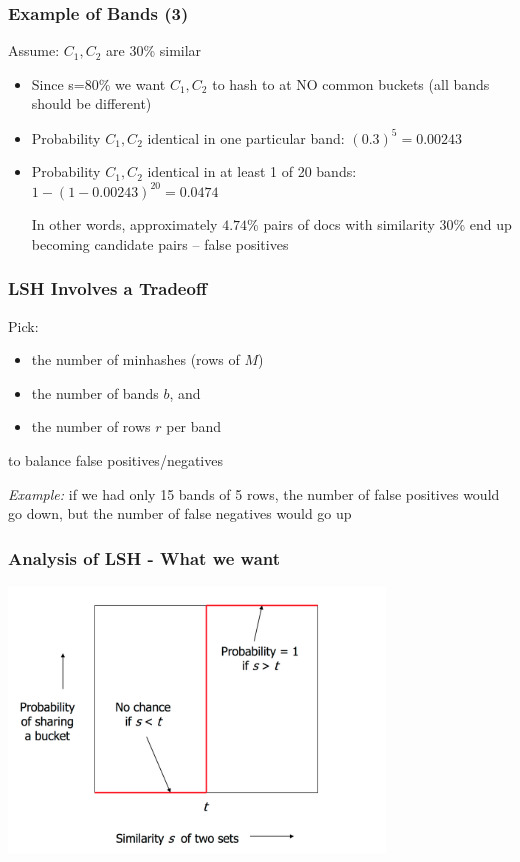 \documentclass[svgnames]{beamer}
\begin{document}
  
\begin{frame} \frametitle{Example of Bands (3)}

\begin{block}{Assume: $C_1, C_2$ are 30\% similar}
\begin{itemize}
\item Since s=80\% we want $C_1, C_2$ to hash to at NO common buckets (all bands should be different)
\item Probability $C_1, C_2$ identical in one particular band: $(0.3)^5 = 0.00243$
\item Probability $C_1, C_2$ identical in at least 1 of 20 bands: $1 - (1 - 0.00243)^{20} = 0.0474$
  \begin{itemize}
  \tem In other words, approximately $4.74$\% pairs of docs with similarity 30\% end up becoming candidate pairs -- false positives
  \end{itemize}
\end{itemize}
\end{block}
\end{frame}

  
\begin{frame} \frametitle{LSH Involves a Tradeoff}
\begin{block}{}
Pick:
\begin{itemize}
  \item the number of minhashes (rows of $M$)
  \item the number of bands $b$, and
  \item the number of rows $r$ per band
\end{itemize}
to balance false positives/negatives
\end{block}

\emph{Example:} if we had only 15 bands of 5 rows, the number of false positives would go down, but the number of false negatives would go up
\end{frame}

  
\begin{frame} \frametitle{Analysis of LSH - What we want}
\includegraphics[width=10cm]{what-we-want}
\end{frame}
\end{document}
